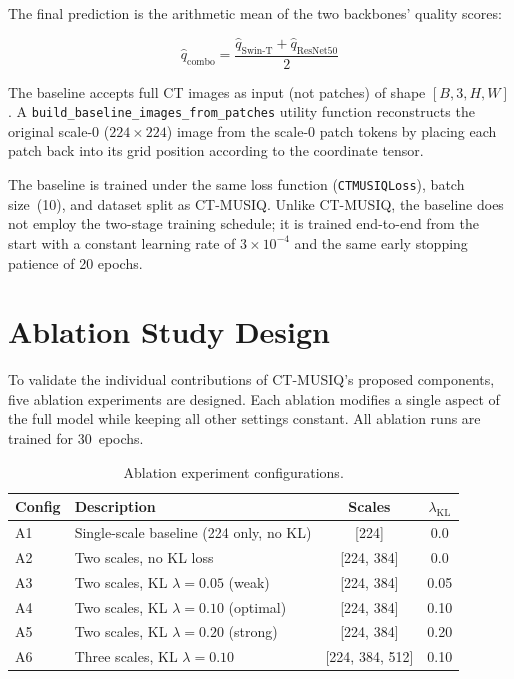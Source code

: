 The final prediction is the arithmetic mean of the two backbones' quality scores:

\begin{equation}
    \hat{q}_{\text{combo}} = \frac{\hat{q}_{\text{Swin-T}} + \hat{q}_{\text{ResNet50}}}{2}
\end{equation}

The baseline accepts full CT images as input (not patches) of shape $[B, 3, H, W]$.
A \texttt{build\_baseline\_images\_from\_patches} utility function reconstructs the
original scale-0 ($224 \times 224$) image from the scale-0 patch tokens by placing each
patch back into its grid position according to the coordinate tensor.

The baseline is trained under the same loss function (\texttt{CTMUSIQLoss}), batch
size~(10), and dataset split as CT-MUSIQ. Unlike CT-MUSIQ, the baseline does not employ
the two-stage training schedule; it is trained end-to-end from the start with a constant
learning rate of $3 \times 10^{-4}$ and the same early stopping patience of 20 epochs.


\section{Ablation Study Design}
\label{sec:ablation}

To validate the individual contributions of CT-MUSIQ's proposed components, five
ablation experiments are designed. Each ablation modifies a single aspect of the full
model while keeping all other settings constant. All ablation runs are trained for
30~epochs.

\begin{table}[h]
    \centering
    \caption{Ablation experiment configurations.}
    \label{tab:ablations}
    \begin{tabular}{llcc}
        \toprule
        Config & Description & Scales & $\lambda_{\text{KL}}$ \\
        \midrule
        A1 & Single-scale baseline (224 only, no KL) & [224]         & 0.0  \\
        A2 & Two scales, no KL loss                  & [224, 384]    & 0.0  \\
        A3 & Two scales, KL $\lambda = 0.05$ (weak)  & [224, 384]    & 0.05 \\
        A4 & Two scales, KL $\lambda = 0.10$ (optimal) & [224, 384]  & 0.10 \\
        A5 & Two scales, KL $\lambda = 0.20$ (strong) & [224, 384]   & 0.20 \\
        A6 & Three scales, KL $\lambda = 0.10$        & [224, 384, 512] & 0.10 \\
        \bottomrule
    \end{tabular}
\end{table}

